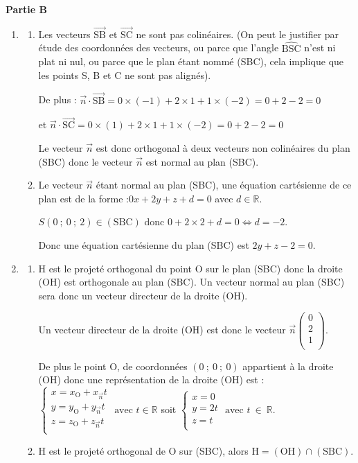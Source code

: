 \documentclass[10pt]{article}
\providecommand{\R}{\mathbb{R}}
\providecommand{\vect}[1]{\overrightarrow{#1}}
\providecommand{\vectt}[1]{\overrightarrow{\mathrm{#1}}}
\begin{document}
	\textbf{Partie B}
	
	\begin{enumerate}
	\item \begin{enumerate}
		\item Les vecteurs $\vectt{SB}$ et $\vectt{SC}$ ne sont pas colinéaires.
		(On peut le justifier par étude des coordonnées des vecteurs, ou parce que l'angle $\widehat{\mathrm{BSC}}$ n'est ni plat ni nul, ou parce que le plan étant nommé (SBC), cela implique que les points S, B et C ne sont pas alignés).

		De plus : \quad $\vect{n} \cdot \vectt{SB} = 0 \times (-1) + 2 \times 1 +1 \times (-2) = 0 +2-2=0$

		et \quad $\vect{n} \cdot \vectt{SC} = 0 \times (1) + 2 \times 1 +1 \times (-2) = 0 +2-2=0$

		Le vecteur $\vect{n}$ est donc orthogonal à deux vecteurs non colinéaires du plan (SBC) donc le vecteur $\vect{n}$ est normal au plan (SBC).

		\item Le vecteur $\vect{n}$ étant normal au plan (SBC), une équation cartésienne de ce plan est de la forme :\quad $0x+2y+z+d=0$ \quad avec $d \in \R$.

		$S(0~;~0~;~2) \in (\mathrm{SBC})$ \quad donc \quad $0+2\times 2+d=0 \iff d=-2$.

		Donc une équation cartésienne du plan (SBC) est \quad $2 y+z-2=0$.

\end{enumerate}
\item
	\begin{enumerate}
			\item H est le projeté orthogonal du point O sur le plan (SBC) donc la droite (OH) est orthogonale au plan (SBC). Un vecteur normal au plan (SBC) sera donc un vecteur directeur de la droite (OH).

Un vecteur directeur de la droite (OH) est donc le vecteur $\vect{n}\begin{pmatrix} 0\\ 2\\ 1\\ \end{pmatrix}$.

De plus le point O, de coordonnées $(0~;~0~;~0)$ appartient à la droite (OH) donc une représentation de la droite (OH) est :\quad
$\begin{cases}
x =x_{\text{O}} + x_{\vect{n}}t\\
y =y_{\text{O}} + y_{\vect{n}}t\\
z =z_{\text{O}} + z_{\vect{n}}t\\
	\end{cases}\text{ avec } t \in \R$ \quad soit \quad
	$\begin{cases}
x =0\\
y =2 t\\
z =t\\
\end{cases}\text{ avec } t~\in~\R.$
		\item H est le projeté orthogonal de O sur (SBC), alors $\mathrm{H} = (\mathrm{OH}) \cap \mathrm{(SBC)}$.


\end{enumerate}
\end{enumerate}
\end{document}
